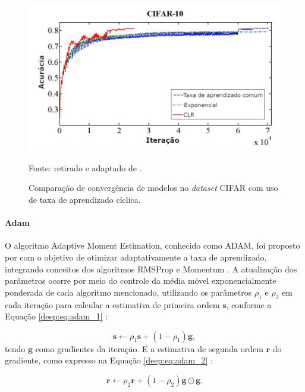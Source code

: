 \begin{figure}[H]
    \centering
    \caption{Comparação de convergência de modelos no \textit{dataset} CIFAR \citep{Krizhevsky2014TheDataset} com uso de taxa de aprendizado cíclica.}
    \includegraphics[width=0.8\linewidth]{recursos/imagens/deep/cifar_lr.png}
    \label{deep:optimization:cyclical_lr}

    Fonte: retirado e adaptado de \cite{Smith2017CyclicalNetworks}.
\end{figure}

\paragraph{Adam}
\label{deep:optimization:adam}

O algoritmo Adaptive Moment Estimation, conhecido como ADAM, foi proposto por \cite{Kingma2014Adam:Optimizationb} com o objetivo de otimizar adaptativamente a taxa de aprendizado, integrando conceitos dos algoritmos RMSProp \citep{Hinton2012NeuralDescent} e Momentum \citep{Polyak1964SomeMethods}. A atualização dos parâmetros ocorre por meio do controle da média móvel exponencialmente ponderada de cada algoritmo mencionado, utilizando os parâmetros $\rho_{1}$ e $\rho_{2}$ em cada iteração para calcular a estimativa de primeira ordem $\boldsymbol{s}$, conforme a Equação \ref{deep:eq:adam_1} \citep{Goodfellow2016}:

\begin{equation}
    \label{deep:eq:adam_1}
    \boldsymbol{s} \leftarrow \rho_{1} \boldsymbol{s} + (1 - \rho_{1})\boldsymbol{g},
\end{equation}
tendo $\boldsymbol{g}$ como gradientes da iteração. E a estimativa de segunda ordem $\boldsymbol{r}$ do gradiente, como expresso na Equação \ref{deep:eq:adam_2} \citep{Goodfellow2016}:

\begin{equation}
    \label{deep:eq:adam_2}
    \boldsymbol{r} \leftarrow \rho_{2} \boldsymbol{r} + (1 - \rho_{2})\boldsymbol{g} \odot \boldsymbol{g}.
\end{equation}


